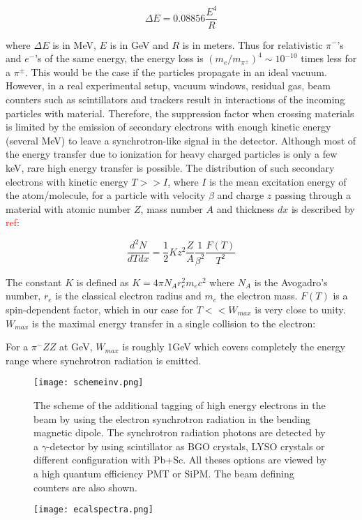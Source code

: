 \begin{equation}
\Delta E = 0.08856\frac{E^4}{R}
\end{equation}

where $\Delta E$ is in \unit{MeV}, $E$ is in \unit{GeV} and $R$ is in meters. Thus for relativistic $\pi^-$'s and
$e^-$'s of the same energy, the energy loss is $(m_e/m_{\pi^{\pm}})^4\sim 10^{-10}$ times less for a $\pi^{\pm}$. This
would be the case if the particles propagate in an ideal vacuum. However, in a real experimental setup, vacuum windows,
residual gas, beam counters such as scintillators and trackers result in interactions of the incoming particles with
material. Therefore, the suppression factor when crossing materials is limited by the emission of secondary electrons
with enough kinetic energy (several MeV) to leave a synchrotron-like signal in the detector. Although most of the energy
transfer due to ionization for heavy charged particles is only a few keV, rare high energy transfer is possible. The
distribution of such secondary electrons with kinetic energy $T>>I$, where $I$ is the mean excitation energy of the
atom/molecule, for a particle with velocity $\beta$ and charge $z$ passing through a material with atomic number $Z$,
mass number $A$ and thickness $dx$ is described by \textcolor{red}{ref}:

\begin{equation}
\frac{d^2N}{dTdx}=\frac{1}{2}Kz^2\frac{Z}{A}\frac{1}{\beta^2}\frac{F(T)}{T^2}
\end{equation}

The constant $K$ is defined as $K=4\pi N_A r^2_em_ec^2$ where $N_A$ is the Avogadro's number, $r_e$ is the classical
electron radius and $m_e$ the electron mass. $F(T)$ is a spin-dependent factor, which in our case for $T<<W_{max}$ is
very close to unity. $W_{max}$ is the maximal energy transfer in a single collision to the electron:

For a $\pi^-ZZ$ at \si{\giga\electronvolt}, $W_{max}$ is roughly 1\si{\giga\electronvolt} which covers completely the
energy range where synchrotron radiation is emitted. 


\begin{figure}[ht]
	\hspace*{\fill}
	\centering
	\texttt{[image: schemeinv.png]}
	\hspace*{\fill}
	\caption{The scheme of the additional tagging of high energy electrons in the beam by using the electron synchrotron
	radiation in the bending magnetic dipole. The synchrotron radiation photons are detected by a $\gamma$-detector by
	using scintillator as BGO crystals, LYSO crystals or different configuration with Pb+Sc. All theses options are viewed
	by a high quantum efficiency PMT or SiPM. The beam defining counters are also shown.}
	\label{fig:schemeinv}
\end{figure}
\begin{figure}[ht]
	\hspace*{\fill}
	\centering
	\texttt{[image: ecalspectra.png]}
	\hspace*{\fill}
	\caption{}\label{ecalspectra}
\end{figure}

